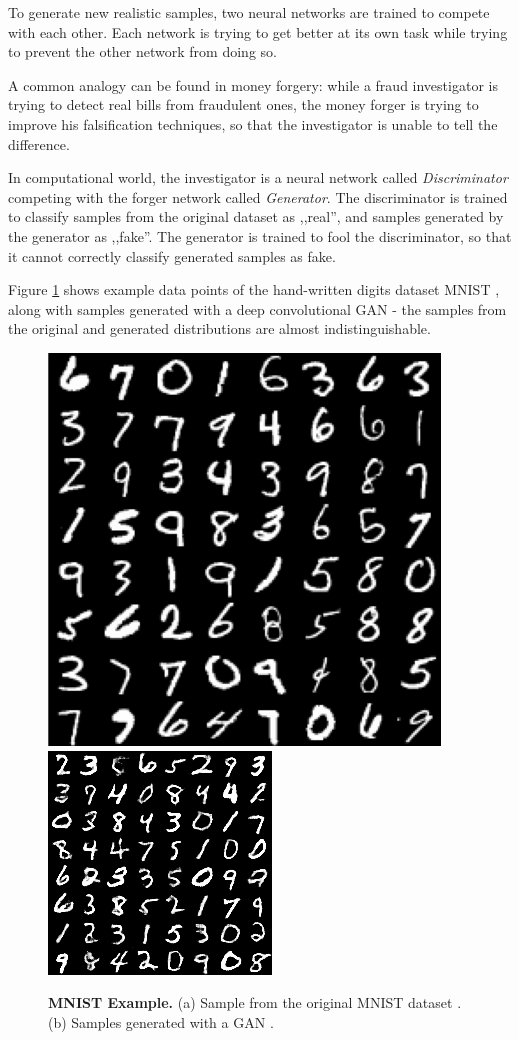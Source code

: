 \documentclass[12pt]{report}
\begin{document}
To generate new realistic samples, two neural networks are trained to compete with each other. Each network is trying to get better at its own task while trying to prevent the other network from doing so. 

A common analogy can be found in money forgery: while a fraud investigator is trying to detect real bills from fraudulent ones, the money forger is trying to improve his falsification techniques, so that the investigator is unable to tell the difference.

In computational world, the investigator is a neural network called \textit{Discriminator} competing with the forger network called \textit{Generator}. The discriminator is trained to classify samples from the original dataset as ,,real'', and samples generated by the generator as ,,fake''. The generator is trained to fool the discriminator, so that it cannot correctly classify generated samples as fake.

Figure \ref{fig:mnist} shows example data points of the hand-written digits dataset MNIST \cite{lecun_mnist_nodate}, along with samples generated with a deep convolutional GAN \cite{kim_dcgan-tensorflow_2018} - the samples from the original and generated distributions are almost indistinguishable.

\begin{figure}[h]
\centering
{}
{\includegraphics[width=.35\linewidth]{02_background/mnist_orig}}\hspace{0.5cm}
{\includegraphics[width=.35\linewidth]{02_background/mnist_dcgan}}
\caption{\label{fig:mnist} \textbf{MNIST Example.}
(a) Sample from the original MNIST dataset \cite{lecun_mnist_nodate}. (b) Samples generated with a GAN \cite{kim_dcgan-tensorflow_2018}.}
\end{figure}
\end{document}
